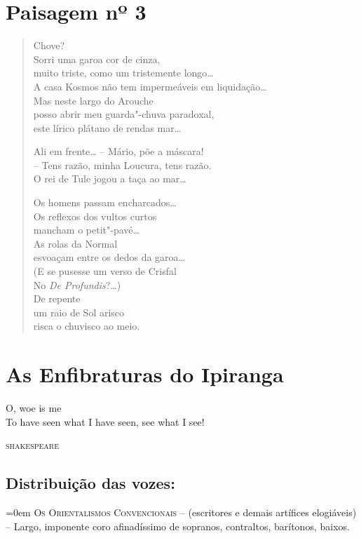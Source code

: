 \chapter{Paisagem nº 3}

\begin{verse}
Chove?\\
Sorri uma garoa cor de cinza,\\
muito triste, como um tristemente longo\ldots{}\\
A casa Kosmos não tem impermeáveis em liquidação\ldots{}\\
Mas neste largo do Arouche\\
posso abrir meu guarda"-chuva paradoxal,\\
este lírico plátano de rendas mar\ldots{}

Ali em frente\ldots{} -- Mário, põe a máscara!\\
-- Tens razão, minha Loucura, tens razão.\\
O rei de Tule jogou a taça ao mar\ldots{}

Os homens passam encharcados\ldots{}\\
Os reflexos dos vultos curtos\\
mancham o petit"-pavé\ldots{}\\
As rolas da Normal\\
esvoaçam entre os dedos da garoa\ldots{}\\
(E se pusesse um verso de Crisfal\\
No \emph{De Profundis}?\ldots{})\\
De repente\\
um raio de Sol arisco\\
risca o chuvisco ao meio.
\end{verse}

\chapter[As Enfibraturas do Ipiranga]{As Enfibraturas do Ipiranga }


\epigraph{O, woe is me\\
To have seen what I have seen, see what I see!}{\textsc{shakespeare}}

\section*{Distribuição das vozes:}

\begingroup\parindent=0em
\textsc{Os Orientalismos Convencionais} -- (escritores e demais
artífices elogiáveis) -- Largo, imponente coro afinadíssimo de sopranos,
contraltos, barítonos, baixos.

